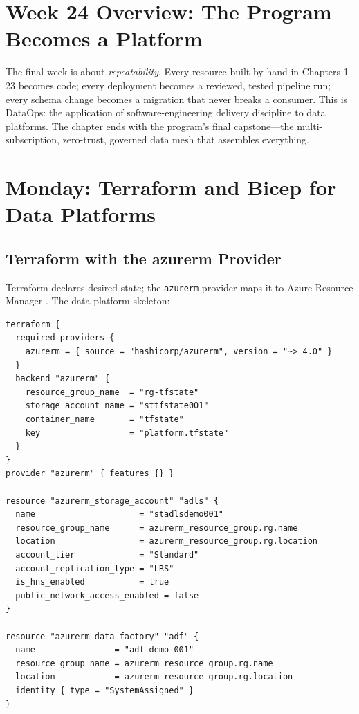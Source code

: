 \section{Week 24 Overview: The Program Becomes a Platform}
The final week is about \emph{repeatability}. Every resource built by hand in Chapters 1--23 becomes code; every deployment becomes a reviewed, tested pipeline run; every schema change becomes a migration that never breaks a consumer. This is DataOps: the application of software-engineering delivery discipline to data platforms. The chapter ends with the program's final capstone---the multi-subscription, zero-trust, governed data mesh that assembles everything.

\section{Monday: Terraform and Bicep for Data Platforms}

\subsection{Terraform with the azurerm Provider}
Terraform declares desired state; the \texttt{azurerm} provider maps it to Azure Resource Manager \cite{hashicorp2025azurerm}. The data-platform skeleton:

\begin{lstlisting}[language={},caption={Terraform for the storage and orchestration foundation.},label={lst:ch24-terraform}]
terraform {
  required_providers {
    azurerm = { source = "hashicorp/azurerm", version = "~> 4.0" }
  }
  backend "azurerm" {
    resource_group_name  = "rg-tfstate"
    storage_account_name = "sttfstate001"
    container_name       = "tfstate"
    key                  = "platform.tfstate"
  }
}
provider "azurerm" { features {} }

resource "azurerm_storage_account" "adls" {
  name                     = "stadlsdemo001"
  resource_group_name      = azurerm_resource_group.rg.name
  location                 = azurerm_resource_group.rg.location
  account_tier             = "Standard"
  account_replication_type = "LRS"
  is_hns_enabled           = true
  public_network_access_enabled = false
}

resource "azurerm_data_factory" "adf" {
  name                = "adf-demo-001"
  resource_group_name = azurerm_resource_group.rg.name
  location            = azurerm_resource_group.rg.location
  identity { type = "SystemAssigned" }
}
\end{lstlisting}

